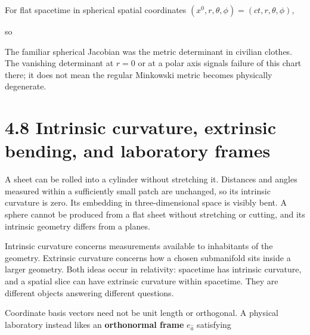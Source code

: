 \documentclass[
  11pt,
  letterpaper,
  oneside,
  openany]{scrbook}
\begin{document}
For flat spacetime in spherical spatial coordinates
\((x^0,r,\theta,\phi)=(ct,r,\theta,\phi)\),

\begin{center}
\begingroup
{}
\ifdim\wd\grmathbox>\linewidth
\resizebox{\linewidth}{!}{\usebox{\grmathbox}}
\else\usebox{\grmathbox}\fi
\endgroup
\end{center}

so

\begin{center}
\begingroup
{}
\ifdim\wd\grmathbox>\linewidth
\resizebox{\linewidth}{!}{\usebox{\grmathbox}}
\else\usebox{\grmathbox}\fi
\endgroup
\end{center}

The familiar spherical Jacobian was the metric determinant in civilian
clothes. The vanishing determinant at \(r=0\) or at a polar axis signals
failure of this chart there; it does not mean the regular Minkowski
metric becomes physically degenerate.

\hypertarget{intrinsic-curvature-extrinsic-bending-and-laboratory-frames}{%
\section{4.8 Intrinsic curvature, extrinsic bending, and laboratory
frames}\label{intrinsic-curvature-extrinsic-bending-and-laboratory-frames}}

A sheet can be rolled into a cylinder without stretching it. Distances
and angles measured within a sufficiently small patch are unchanged, so
its intrinsic curvature is zero. Its embedding in three-dimensional
space is visibly bent. A sphere cannot be produced from a flat sheet
without stretching or cutting, and its intrinsic geometry differs from a
plane\textquotesingle s.

Intrinsic curvature concerns measurements available to inhabitants of
the geometry. Extrinsic curvature concerns how a chosen submanifold sits
inside a larger geometry. Both ideas occur in relativity: spacetime has
intrinsic curvature, and a spatial slice can have extrinsic curvature
within spacetime. They are different objects answering different
questions.

Coordinate basis vectors need not be unit length or orthogonal. A
physical laboratory instead likes an \textbf{orthonormal frame}
\(e_{\hat a}\) satisfying
\end{document}
